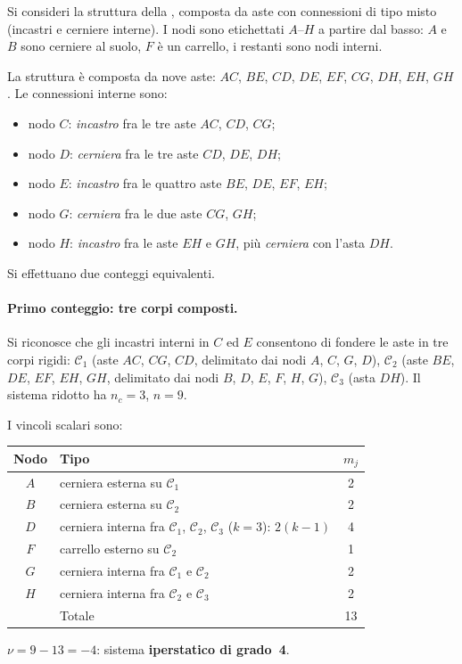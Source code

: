 \begin{esempio}
	\label{ex:struttura_mista}
	Si consideri la struttura della ,
	composta da aste con connessioni di tipo misto (incastri
	e cerniere interne). I nodi sono etichettati
	$A$--$H$ a partire dal basso: $A$ e $B$ sono cerniere
	al suolo, $F$ è un carrello, i restanti sono nodi
	interni.
	


	
	La struttura è composta da nove aste: $AC$, $BE$, $CD$,
	$DE$, $EF$, $CG$, $DH$, $EH$, $GH$. Le connessioni
	interne sono:
	\begin{itemize}[nosep]
		\item nodo $C$: \emph{incastro} fra le tre aste
		$AC$, $CD$, $CG$;
		\item nodo $D$: \emph{cerniera} fra le tre aste
		$CD$, $DE$, $DH$;
		\item nodo $E$: \emph{incastro} fra le quattro aste
		$BE$, $DE$, $EF$, $EH$;
		\item nodo $G$: \emph{cerniera} fra le due aste
		$CG$, $GH$;
		\item nodo $H$: \emph{incastro} fra le aste $EH$
		e $GH$, più \emph{cerniera} con l'asta $DH$.
	\end{itemize}
	
	Si effettuano due conteggi equivalenti.
	
	\paragraph{Primo conteggio: tre corpi composti.}
	Si riconosce che gli incastri interni in $C$ ed $E$
	consentono di fondere le aste in tre corpi rigidi:
	$\mathcal{C}_1$ (aste $AC$, $CG$, $CD$, delimitato
	dai nodi $A$, $C$, $G$, $D$), $\mathcal{C}_2$ (aste
	$BE$, $DE$, $EF$, $EH$, $GH$, delimitato dai nodi
	$B$, $D$, $E$, $F$, $H$, $G$), $\mathcal{C}_3$
	(asta $DH$). Il sistema ridotto ha $n_c = 3$,
	$n = 9$.
	
	I vincoli scalari sono:
	\begin{center}
		\renewcommand{\arraystretch}{1.5}
		\small
		\begin{tabular}{clc}
			\toprule
			Nodo & Tipo & $m_j$ \\
			\midrule
			$A$ & cerniera esterna su $\mathcal{C}_1$
			& 2 \\
			$B$ & cerniera esterna su $\mathcal{C}_2$
			& 2 \\
			$D$ & cerniera interna fra
			$\mathcal{C}_1$, $\mathcal{C}_2$,
			$\mathcal{C}_3$ ($k=3$): $2(k-1)$
			& 4 \\
			$F$ & carrello esterno su $\mathcal{C}_2$
			& 1 \\
			$G$ & cerniera interna fra
			$\mathcal{C}_1$ e $\mathcal{C}_2$
			& 2 \\
			$H$ & cerniera interna fra
			$\mathcal{C}_2$ e $\mathcal{C}_3$
			& 2 \\
			\midrule
			& Totale & 13 \\
			\bottomrule
		\end{tabular}
	\end{center}
	$\nu = 9 - 13 = -4$: sistema
	\textbf{iperstatico di grado~4}.
	

\end{esempio}
